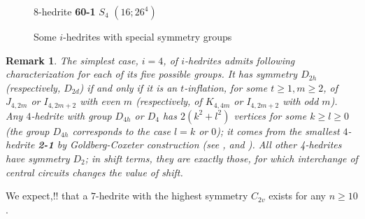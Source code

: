 \documentclass[12pt]{article}
\newtheorem{remark}{Remark}
\begin{document}
\begin{figure}
{%
\begin{minipage}[t]{4cm}
\centering
\epsfxsize=4cm
\par
{$8$-hedrite {\bf 60-1} $S_4$ $(16;26^4)$}
\end{minipage}
}
\caption{Some $i$-hedrites with special symmetry groups}
\label{special-i-hedrites}
\end{figure}








\begin{remark}
The simplest case, $i=4$, of $i$-hedrites admits following characterization for each of
its five possible groups.
It has symmetry $D_{2h}$  (respectively, $D_{2d}$) if and only if it is an
$t$-inflation, for some $t \ge 1, m \ge 2$, of $J_{4,2m}$ or $I_{4,2m+2}$
with even $m$ (respectively, of $K_{4,4m}$ or $I_{4,2m+2}$ with odd $m$).
Any $4$-hedrite with group $D_{4h}$ or $D_4$ has $2(k^2+l^2)$ vertices for
some $k \ge l \ge 0$ (the group $D_{4h}$ corresponds to the case $l=k$ or $0$);
it comes from the smallest $4$-hedrite {\bf 2-1} by Goldberg-Coxeter
construction (see \cite{Gold37}, \cite{Cox71} and \cite{DD03}).
All other 4-hedrites have symmetry $D_2$; in shift terms, they are exactly those, for which interchange of central circuits changes the value of shift.
\end{remark}

We expect,!! that a $7$-hedrite with the highest symmetry $C_{2v}$ 
exists for any $n\geq 10$.
\end{document}
